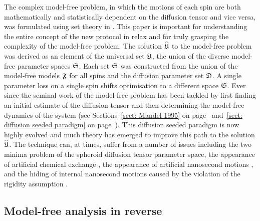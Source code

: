\begin{htmlonly}
\begin{htmlonly}
The complex model-free problem, in which the motions of each spin are both mathematically and statistically dependent on the diffusion tensor and vice versa, was formulated using set theory in \citet{dAuvergneGooley07}.  This paper is important for understanding the entire concept of the new protocol in relax and for truly grasping the complexity of the model-free problem.  The solution $\widehat{\mathfrak{U}}$ to the model-free problem was derived as an element of the universal set $\mathfrak{U}$, the union of the diverse model-free parameter spaces $\mathfrak{S}$.  Each set $\mathfrak{S}$ was constructed from the union of the model-free models $\mathfrak{F}$ for all spins and the diffusion parameter set $\mathfrak{D}$.  A single parameter loss on a single spin shifts optimisation to a different space $\mathfrak{S}$.  Ever since the seminal work of \citet{Kay89} the model-free problem has been tackled by first finding an initial estimate of the diffusion tensor and then determining the model-free dynamics of the system (see Sections~\ref{sect: Mandel 1995} on page~\pageref{sect: Mandel 1995} and~\ref{sect: diffusion seeded paradigm} on page~\pageref{sect: diffusion seeded paradigm}).  This diffusion seeded paradigm is now highly evolved and much theory has emerged to improve this path to the solution $\widehat{\mathfrak{U}}$.  The technique can, at times, suffer from a number of issues including the two minima problem of the spheroid diffusion tensor parameter space, the appearance of artificial chemical exchange \citep{Tjandra96}, the appearance of artificial nanosecond motions \citep{Schurr94}, and the hiding of internal nanosecond motions caused by the violation of the rigidity assumption \citep{Orekhov95b, Orekhov99b, Orekhov99a}.




\subsection{Model-free analysis in reverse}


\end{htmlonly}
\end{htmlonly}
